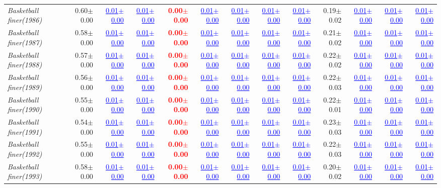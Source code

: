 \documentclass[nohyperref]{article}
\theoremstyle{plain}
\theoremstyle{definition}
\theoremstyle{remark}
\newcommand{\red}[1]{\textcolor{red}{\textbf{#1}}}
\newcommand{\blue}[1]{\textcolor{blue}{\underline{#1}}}
\begin{document}
\begin{table*}[!ht]
{\begin{tabular}{lrr|rrrrr|rrrrr}
			{\it Basketball finer(1986)} & 0.60$\pm$0.00 & \blue{0.01$\pm$0.00} & \blue{0.01$\pm$0.00} & \red{0.00$\pm$0.00} & \blue{0.01$\pm$0.00} & \blue{0.01$\pm$0.00} & \blue{0.01$\pm$0.00} & \blue{0.01$\pm$0.00} & 0.19$\pm$0.02 & \blue{0.01$\pm$0.00} & \blue{0.01$\pm$0.00} & \blue{0.01$\pm$0.00} \\
			{\it Basketball finer(1987)} & 0.58$\pm$0.00 & \blue{0.01$\pm$0.00} & \blue{0.01$\pm$0.00} & \red{0.00$\pm$0.00} & \blue{0.01$\pm$0.00} & \blue{0.01$\pm$0.00} & \blue{0.01$\pm$0.00} & \blue{0.01$\pm$0.00} & 0.21$\pm$0.02 & \blue{0.01$\pm$0.00} & \blue{0.01$\pm$0.00} & \blue{0.01$\pm$0.00} \\
			{\it Basketball finer(1988)} & 0.57$\pm$0.00 & \blue{0.01$\pm$0.00} & \blue{0.01$\pm$0.00} & \red{0.00$\pm$0.00} & \blue{0.01$\pm$0.00} & \blue{0.01$\pm$0.00} & \blue{0.01$\pm$0.00} & \blue{0.01$\pm$0.00} & 0.22$\pm$0.02 & \blue{0.01$\pm$0.00} & \blue{0.01$\pm$0.00} & \blue{0.01$\pm$0.00} \\
			{\it Basketball finer(1989)} & 0.56$\pm$0.00 & \blue{0.01$\pm$0.00} & \blue{0.01$\pm$0.00} & \red{0.00$\pm$0.00} & \blue{0.01$\pm$0.00} & \blue{0.01$\pm$0.00} & \blue{0.01$\pm$0.00} & \blue{0.01$\pm$0.00} & 0.22$\pm$0.03 & \blue{0.01$\pm$0.00} & \blue{0.01$\pm$0.00} & \blue{0.01$\pm$0.00} \\
			{\it Basketball finer(1990)} & 0.55$\pm$0.00 & \blue{0.01$\pm$0.00} & \blue{0.01$\pm$0.00} & \red{0.00$\pm$0.00} & \blue{0.01$\pm$0.00} & \blue{0.01$\pm$0.00} & \blue{0.01$\pm$0.00} & \blue{0.01$\pm$0.00} & 0.22$\pm$0.01 & \blue{0.01$\pm$0.00} & \blue{0.01$\pm$0.00} & \blue{0.01$\pm$0.00} \\
			{\it Basketball finer(1991)} & 0.54$\pm$0.00 & \blue{0.01$\pm$0.00} & \blue{0.01$\pm$0.00} & \red{0.00$\pm$0.00} & \blue{0.01$\pm$0.00} & \blue{0.01$\pm$0.00} & \blue{0.01$\pm$0.00} & \blue{0.01$\pm$0.00} & 0.23$\pm$0.03 & \blue{0.01$\pm$0.00} & \blue{0.01$\pm$0.00} & \blue{0.01$\pm$0.00} \\
			{\it Basketball finer(1992)} & 0.55$\pm$0.00 & \blue{0.01$\pm$0.00} & \blue{0.01$\pm$0.00} & \red{0.00$\pm$0.00} & \blue{0.01$\pm$0.00} & \blue{0.01$\pm$0.00} & \blue{0.01$\pm$0.00} & \blue{0.01$\pm$0.00} & 0.22$\pm$0.03 & \blue{0.01$\pm$0.00} & \blue{0.01$\pm$0.00} & \blue{0.01$\pm$0.00} \\
			{\it Basketball finer(1993)} & 0.58$\pm$0.00 & \blue{0.01$\pm$0.00} & \blue{0.01$\pm$0.00} & \red{0.00$\pm$0.00} & \blue{0.01$\pm$0.00} & \blue{0.01$\pm$0.00} & \blue{0.01$\pm$0.00} & \blue{0.01$\pm$0.00} & 0.20$\pm$0.02 & \blue{0.01$\pm$0.00} & \blue{0.01$\pm$0.00} & \blue{0.01$\pm$0.00} \\

\end{tabular}}
\end{table*}
\end{document}
